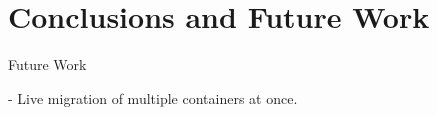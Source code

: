 \chapter{Conclusions and Future Work} \label{chap:conclusion}

Future Work

- Live migration of multiple containers at once.

